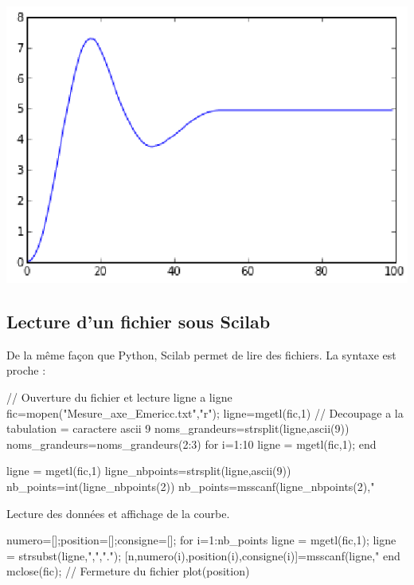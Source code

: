 \documentclass[10pt,fleqn]{article} %
\begin{document}
\begin{exemple}
\begin{center}
\includegraphics[width=.5\textwidth]{images/image9.png}
\end{center}


\end{exemple}


\subsection{Lecture d'un fichier sous Scilab}

De la même façon que Python, Scilab permet de lire des fichiers. La syntaxe est proche :

\begin{sci}
\begin{scilab}[h]
// Ouverture du fichier et lecture ligne a ligne
fic=mopen("Mesure_axe_Emericc.txt","r");
ligne=mgetl(fic,1)
// Decoupage a la tabulation = caractere ascii 9
noms_grandeurs=strsplit(ligne,ascii(9))
noms_grandeurs=noms_grandeurs(2:3)
for i=1:10
    ligne = mgetl(fic,1);
end

ligne = mgetl(fic,1)
ligne_nbpoints=strsplit(ligne,ascii(9))
nb_points=int(ligne_nbpoints(2))
nb_points=msscanf(ligne_nbpoints(2),"%
\end{scilab}



Lecture des données et affichage de la courbe.


\begin{scilab}[h]
numero=[];position=[];consigne=[];
for i=1:nb_points
    ligne = mgetl(fic,1);
    ligne = strsubst(ligne,",",".");
    [n,numero(i),position(i),consigne(i)]=msscanf(ligne,"%
end
mclose(fic);                    // Fermeture du fichier
plot(position)
\end{scilab}
\end{sci}
\end{document}
